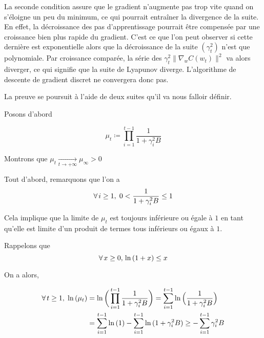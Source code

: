 \documentclass{article}
\begin{document}
La seconde condition assure que le gradient n'augmente pas trop vite quand on s'éloigne un peu du minimum, ce qui pourrait entraîner la divergence de la suite. En effet, la décroissance des pas d'apprentissage pourrait être compensée par une croissance bien plus rapide du gradient. C'est ce que l'on peut observer si cette dernière est exponentielle alors que la décroissance de la suite $(\gamma_t^{2})$ n'est que polynomiale. Par croissance comparée, la série des $\gamma_t^{2} \lVert \nabla_wC(w_t) \rVert^{2}$ va alors diverger, ce qui signifie que la suite de Lyapunov diverge. L'algorithme de descente de gradient discret ne convergera donc pas. 
\bigskip

La preuve se poursuit à l'aide de deux suites qu'il va nous falloir définir. 
\bigskip

Posons d'abord

\begin{equation*}
    \mu_t \coloneqq \prod_{i=1}^{t-1} \frac{1}{1 + \gamma_i^{2}B}
\end{equation*}
\bigskip

Montrons que $\mu_t \underset{t\to+\infty}{\longrightarrow} \mu_{\infty} > 0$
\bigskip

Tout d'abord, remarquons que l'on a 
\begin{equation*}
    \forall \hspace{0.05cm} i \geq 1, \hspace{0.1cm} 0< \frac{1}{1 + \gamma_i^{2}B} \leq 1
\end{equation*} 

Cela implique que la limite de $\mu_t$ est toujours inférieure ou égale à $1$ en tant qu'elle est limite d'un produit de termes tous inférieurs ou égaux à $1$.
\bigskip


Rappelons que 
\begin{equation*}
    \forall \hspace{0.05cm} x \geq 0, \hspace{0.05cm} \ln{(1 + x)} \leq x
\end{equation*}

On a alors,

\begin{equation*}
    \begin{split}
        \forall \hspace{0.05cm} t \geq 1, \hspace{0.1cm} \ln{(\mu_t)} & = \ln{\bigg(\prod_{i=1}^{t-1} \frac{1}{1 + \gamma_i^{2}B}}\bigg) = \sum_{i=1}^{t-1} \ln{\Big(\frac{1}{1 + \gamma_i^{2}B}\Big)} \\
        & = \sum_{i=1}^{t-1} \ln{(1)} - \sum_{i=1}^{t-1} \ln{(1 + \gamma_i^{2}B)} \geq - \sum_{i=1}^{t-1}{\gamma_i^{2}B}
    \end{split}
\end{equation*}
\bigskip
\end{document}
